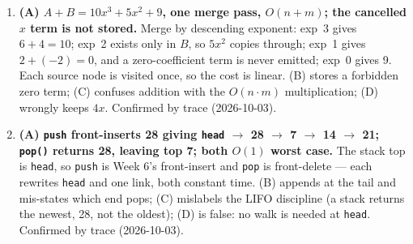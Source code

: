 \documentclass[11pt]{article}
\begin{document}
\begin{enumerate}
\item[\textbf{Q9}] \textbf{(A) $A + B = 10x^{3} + 5x^{2} + 9$, one merge pass, $O(n+m)$; the cancelled $x$ term is not stored.} Merge by descending exponent: exp~3 gives $6 + 4 = 10$; exp~2 exists only in $B$, so $5x^{2}$ copies through; exp~1 gives $2 + (-2) = 0$, and a zero-coefficient term is never emitted; exp~0 gives 9. Each source node is visited once, so the cost is linear. (B) stores a forbidden zero term; (C) confuses addition with the $O(n \cdot m)$ multiplication; (D) wrongly keeps $4x$. Confirmed by trace (2026-10-03).

\item[\textbf{Q10}] \textbf{(A) \texttt{push} front-inserts 28 giving \texttt{head} $\to$ 28 $\to$ 7 $\to$ 14 $\to$ 21; \texttt{pop()} returns 28, leaving top 7; both $O(1)$ worst case.} The stack top is \texttt{head}, so \texttt{push} is Week 6's front-insert and \texttt{pop} is front-delete --- each rewrites \texttt{head} and one link, both constant time. (B) appends at the tail and mis-states which end pops; (C) mislabels the LIFO discipline (a stack returns the newest, 28, not the oldest); (D) is false: no walk is needed at \texttt{head}. Confirmed by trace (2026-10-03).
\end{enumerate}
\end{document}
